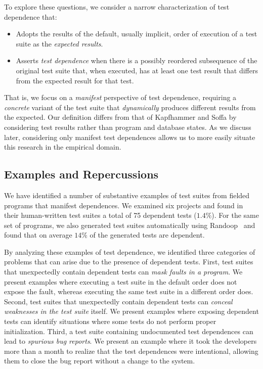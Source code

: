 To explore these questions, we consider a narrow characterization
of test dependence that:
\begin{itemize}
\item Adopts the results of the default, usually implicit,
  order of execution of a test suite as the \emph{expected results}. 
\item Asserts \emph{test dependence\/} when there is a possibly
  reordered subsequence of the original test suite that, when
  executed, has at least one test result that differs from the
  expected result for that test.  
\end{itemize}
That is, we focus on a \emph{manifest\/} perspective of test dependence,
requiring a \emph{concrete\/} variant of the test suite that
\emph{dynamically\/} produces different results from the expected.  Our
definition differs from that of Kapfhammer and Soffa by considering
test results rather than program and database states.
As we discuss later, considering only manifest test dependences allows
us to more easily situate this research in the empirical domain.


\subsection{Examples and Repercussions}

We have identified a number of substantive examples of test suites
from fielded programs that manifest dependences.
We examined
six projects and found in their human-written test suites a total
of 75 dependent tests ($1.4 \%$). For the same set of
programs, we also generated test suites automatically using
Randoop~\cite{PachecoLET2007} and found that on average $14 \%$ of
the generated tests are dependent.


By analyzing these examples of test dependence, we identified three
categories of problems that can arise due to the presence of dependent tests.
First, test suites that unexpectedly contain dependent tests can
\emph{mask faults in a program}.  We present examples where
executing a test suite in the default order does not expose the fault, whereas
executing the same test suite in a different order does.
Second, test suites that unexpectedly contain dependent tests can \emph{conceal
weaknesses in the test suite} itself.  We present examples where exposing
dependent tests can identify situations where some tests do not perform
proper initialization.
Third, a test suite containing undocumented test dependences can lead
to \emph{spurious bug reports}.  We present an example where it took the developers
more than a month to realize that the test dependences were intentional,
allowing them to close the bug report without a change to the system.


